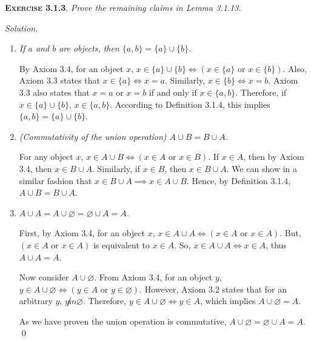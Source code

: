 \documentclass[12pt]{article}
\theoremstyle{remark}
\newenvironment{exer}[2]{
    \noindent \setlength{\parskip}{1em}%
    \textsc{\textbf{Exercise #1}}. \textit{#2} \par
    \noindent \textit{Solution.} %
}{\bigskip}
\begin{document}
\begin{exer}{3.1.3}{
    Prove the remaining claims in Lemma 3.1.13.
}
    \begin{enumerate}[topsep=0mm, label=(\alph*)]
        \item \textit{If $a$ and $b$ are objects, then $\{ a, b \} = \{ a \} \cup \{ b \}$.}

            By Axiom 3.4, for an object $x$, $x \in \{ a \} \cup \{ b \} \iff (x \in \{ a \}  \text{ or } x \in \{ b \})$.
            Also, Axiom 3.3 states that $x \in \{ a \} \iff x = a$.
            Similarly, $x \in \{ b \} \iff x = b$.
            Axiom 3.3 also states that $x = a$ or $x = b$ if and only if $x \in \{ a, b \}$.
            Therefore, if $x \in \{ a \} \cup \{ b \}$, $x \in \{ a, b \}$.
            According to Definition 3.1.4, this implies $\{ a, b \} = \{ a \} \cup \{ b \}$.

        \item \textit{(Commutativity of the union operation) $A \cup B = B \cup A$.}

            For any object $x$, $x \in A \cup B \iff (x \in A \text{ or } x \in B)$.
            If $x \in A$, then by Axiom 3.4, then $x \in B \cup A$.
            Similarly, if $x \in B$, then $x \in B \cup A$.
            We can show in a similar fashion that $x \in B \cup A \implies x \in A \cup B$.
            Hence, by Definition 3.1.4, $A \cup B = B \cup A$.

        \item \textit{$A \cup A = A \cup \varnothing = \varnothing \cup A = A$.}

            First, by Axiom 3.4, for an object $x$, $x \in A \cup A \iff (x \in A \text{ or } x \in A)$.
            But, $(x \in A \text{ or } x \in A)$ is equivalent to $x \in A$.
            So, $x \in A \cup A \iff x \in A$, thus $A \cup A = A$.

            Now consider $A \cup \varnothing$.
            From Axiom 3.4, for an object $y$, $y \in A \cup \varnothing \iff (y \in A \text{ or } y \in \varnothing)$.
            However, Axiom 3.2 states that for an arbitrary $y$, $y \not in \varnothing$.
            Therefore, $y \in A \cup \varnothing \iff y \in A$, which implies $A \cup \varnothing = A$.

            As we have proven the union operation is commutative, $A \cup \varnothing = \varnothing \cup A = A$. \qed
            
    \end{enumerate}
\end{exer}
\end{document}
